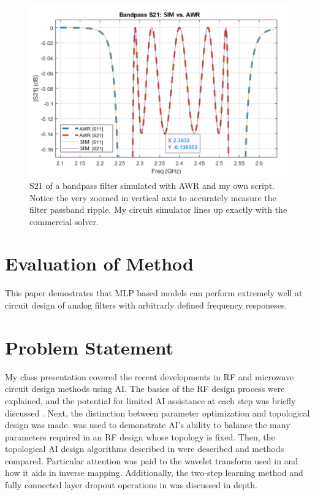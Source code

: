 \documentclass[10pt,conference]{IEEEtran}
\begin{document}
\begin{figure}
	\centering
	\includegraphics[width=0.9\linewidth]{Figures/MATLAB_vs_AWR_2.png}
	\caption{S21 of a bandpass filter simulated with AWR and my own script. Notice the very zoomed in vertical axis to accurately measure the filter passband ripple. My circuit simulator lines up exactly with the commercial solver.}
	\label{MATLAB_vs_AWR_2}
\end{figure}





\section{Evaluation of Method}

This paper demostrates that MLP based models can perform extremely well at circuit design of analog filters with arbitrarly defined frequency responeses. 





\section{Problem Statement}






My class presentation covered the recent developments in RF and microwave circuit design methods using AI. The basics of the RF design process were explained, and the potential for limited AI assistance at each step was briefly discussed \cite{lee2024icdesign}. Next, the distinction between parameter optimization and topological design was made. \cite{xue2023mmic} was used to demonstrate AI's ability to balance the many parameters required in an RF design whose topology is fixed. Then, the topological AI design algorithms described in \cite{xu2024microwave, karahan2024rfdesign, taskiran2024annsynthesis} were described and methods compared. Particular attention was paid to the wavelet transform used in \cite{xu2024microwave} and how it aids in inverse mapping. Additionally, the two-step learning method and fully connected layer dropout operations in \cite{karahan2024rfdesign} was discussed in depth.
\end{document}
